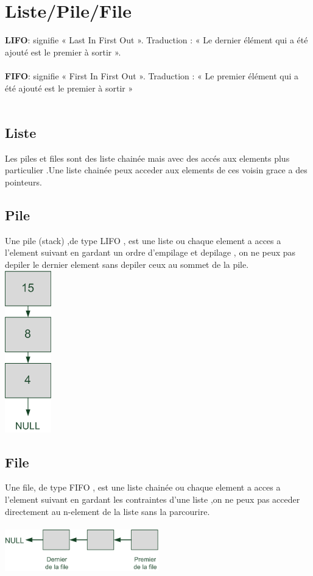 \documentclass[a4paper,12pt,openany]{book}
\begin{document}

\chapter{Liste/Pile/File}

\textbf{LIFO}: signifie « Last In First Out ». Traduction : « Le dernier élément qui a été ajouté est le premier à sortir ».\\
 \\
\textbf{FIFO}: signifie « First In First Out ». Traduction : « Le premier élément qui a été ajouté est le premier à sortir » \\
\\


\section{Liste}

Les piles et files sont des liste chainée mais avec des accés aux elements plus particulier .Une liste chainée peux acceder aux elements de ces voisin grace a des pointeurs.\\


\section{Pile}

Une pile (stack) ,de type LIFO , est une liste ou chaque element a acces a l'element suivant en gardant un ordre d'empilage et depilage , on ne peux pas depiler le dernier element sans depiler ceux au sommet de la pile.\\
\includegraphics[height=0.35\textwidth,center]{pile_c.png}


\section{File}

Une file, de type FIFO , est une liste chainée ou chaque element a acces a l'element suivant en gardant les contraintes d'une liste ,on ne peux pas acceder directement au n-element de la liste sans la parcourire.\\
\\
\includegraphics[width=0.5\textwidth,center]{file_c.png}
\end{document}

